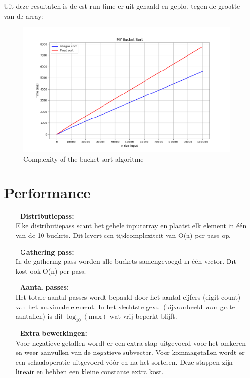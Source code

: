 \documentclass{article}
\begin{document}
Uit deze resultaten is de est run time er uit gehaald en geplot tegen de grootte van de array:
\begin{figure}[H]
    \includegraphics[width=1\textwidth]{images/bucket_sort.png}
    \caption{Complexity of the bucket sort-algoritme}
    \label{fig:complexity}
\end{figure}

\section{Performance}
\begin{itemize}
\item[-] \textbf{Distributiepass:} \\
Elke distributiepass scant het gehele inputarray en plaatst elk element in één van de 10 buckets. Dit levert een tijdcomplexiteit van O(n) per pass op.

\item[-] \textbf{Gathering pass:} \\
In de gathering pass worden alle buckets samengevoegd in één vector. Dit kost ook O(n) per pass.

\item[-] \textbf{Aantal passes:} \\
Het totale aantal passes wordt bepaald door het aantal cijfers (digit count) van het maximale element. In het slechtste geval (bijvoorbeeld voor grote aantallen) is dit $\log_{10}(\mathrm{max})$ wat vrij beperkt blijft.

\item[-] \textbf{Extra bewerkingen:} \\
Voor negatieve getallen wordt er een extra stap uitgevoerd voor het omkeren en weer aanvullen van de negatieve subvector.
Voor kommagetallen wordt er een schaaloperatie uitgevoerd vóór en na het sorteren. Deze stappen zijn lineair en hebben een kleine constante extra kost.
\end{itemize}
\end{document}
